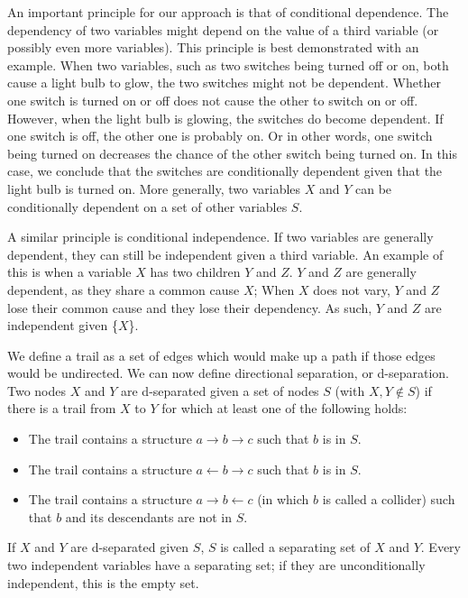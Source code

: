 \documentclass[a4paper, 10pt, english, twocolumn]{article}
\begin{document}
An important principle for our approach is that of conditional dependence.
The dependency of two variables might depend on the value of a third variable (or possibly even more variables).
This principle is best demonstrated with an example.
When two variables, such as two switches being turned off or on, both cause a light bulb to glow, the two switches might not be dependent.
Whether one switch is turned on or off does not cause the other to switch on or off.
However, when the light bulb is glowing, the switches do become dependent.
If one switch is off, the other one is probably on.
Or in other words, one switch being turned on decreases the chance of the other switch being turned on.
In this case, we conclude that the switches are conditionally dependent given that the light bulb is turned on.
More generally, two variables $X$ and $Y$ can be conditionally dependent on a set of other variables $S$. %

A similar principle is conditional independence.
If two variables are generally dependent, they can still be independent given a third variable.
An example of this is when a variable $X$ has two children $Y$ and $Z$.
$Y$ and $Z$ are generally dependent, as they share a common cause $X$;
When $X$ does not vary, $Y$ and $Z$ lose their common cause and they lose their dependency.
As such, $Y$ and $Z$ are independent given \{$X$\}. 

We define a trail as a set of edges which would make up a path if those edges would be undirected.
We can now define directional separation, or d-separation.
Two nodes $X$ and $Y$ are d-separated given a set of nodes $S$ (with $X, Y \notin S$) if there is a trail from $X$ to $Y$ for which at least one of the following holds:
\begin{itemize}
\item The trail contains a structure $a \rightarrow b \rightarrow c$ such that $b$ is in $S$.
\item The trail contains a structure $a \leftarrow b \rightarrow c$ such that $b$ is in $S$.
\item The trail contains a structure $a \rightarrow b \leftarrow c$ (in which $b$ is called a collider) such that $b$ and its descendants are not in $S$.
\end{itemize}
If $X$ and $Y$ are d-separated given $S$, $S$ is called a separating set of $X$ and $Y$. Every two independent variables have a separating set; if they are unconditionally independent, this is the empty  set.
\end{document}
